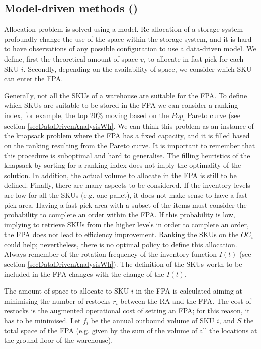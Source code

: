 \subsection{Model-driven methods ()}
Allocation problem is solved using a model. Re-allocation of a storage system profoundly change the use of the space within the storage system, and it is hard to have observations of any possible configuration to use a data-driven model. We define, first the theoretical amount of space $v_i$ to allocate in fast-pick for each SKU $i$. Secondly, depending on the availability of space, we consider which SKU can enter the FPA. \par

Generally, not all the SKUs of a warehouse are suitable for the FPA. To define which SKUs are suitable to be stored in the FPA we can consider a ranking index, for example, the top 20\% moving based on the $Pop_i$ Pareto curve (see section \ref{secDataDrivenAnalysisWh}. We can think this problem as an instance of the knapsack problem where the FPA has a fixed capacity, and it is filled based on the ranking resulting from the Pareto curve. It is important to remember that this procedure is suboptimal and hard to generalise. The filling heuristics of the knapsack by sorting for a ranking index does not imply the optimality of the solution. In addition, the actual volume to allocate in the FPA is still to be defined. Finally, there are many aspects to be considered. If the inventory levels are low for all the SKUs (e.g. one pallet), it does not make sense to have a fast pick area. Having a fast pick area with a subset of the items must consider the probability to complete an order within the FPA. If this probability is low, implying to retrieve SKUs from the higher levels in order to complete an order, the FPA does not lead to efficiency improvement. Ranking the SKUs on the $OC_i$ could help; nevertheless, there is no optimal policy to define this allocation. Always remember of the rotation frequency of the inventory function $I(t)$ (see section \ref{secDataDrivenAnalysisWh}). The definition of the SKUs worth to be included in the FPA changes with the change of the $I(t)$. \par

The amount of space to allocate to SKU $i$ in the FPA is calculated aiming at minimising the number of restocks $r_i$ between the RA and the FPA. The cost of restocks is the augmented operational cost of setting an FPA; for this reason, it has to be minimised. Let $f_i$ be the annual outbound volume of SKU $i$, and $S$ the total space of the FPA (e.g. given by the sum of the volume of all the locations at the ground floor of the warehouse).\par

